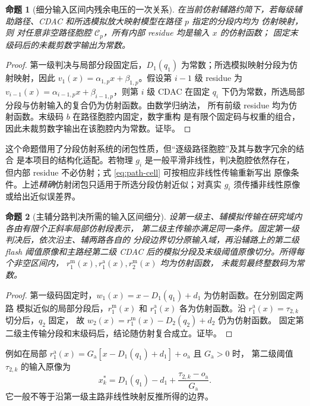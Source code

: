 \documentclass[11pt,a4paper]{ctexart}
\theoremstyle{adcplain}
\newtheorem{proposition}{命题}[section]
\theoremstyle{definition}
\begin{document}
\begin{proposition}[细分输入区间内残余电压的一次关系]
在当前仿射辅路约简下，若每级辅助路径、CDAC 和所选模拟放大映射模型在路径
$p$ 指定的分段内均为
仿射映射，则
对任意非空路径胞腔 $\mathcal C_p$，所有内部 residue 均是输入 $x$ 的仿射函数；
固定末级码后的未裁剪数字输出为常数。
\end{proposition}

\begin{proof}
第一级判决与局部分段固定后，$D_1(q_1)$ 为常数；所选模拟映射分段为仿射映射，因此
$v_1(x)=\alpha_{1,p}x+\beta_{1,p}$。假设第 $i-1$ 级 residue 为
$v_{i-1}(x)=\alpha_{i-1,p}x+\beta_{i-1,p}$，则第 $i$ 级 CDAC 在固定
$q_i$ 下仍为常数，所选局部分段与仿射输入的复合仍为仿射函数。由数学归纳法，
所有前级 residue 均为仿射函数。末级码 $b$ 在路径胞腔内固定，数字重构
是有限个固定码与权重的组合，因此未裁剪数字输出在该胞腔内为常数。证毕。
\end{proof}

这个命题借用了分段仿射系统的闭包性质，但“逐级路径胞腔”及其与数字冗余的结合
是本项目的结构化适配。若物理 $g_i$ 是一般平滑非线性，判决胞腔依然存在，
但内部 residue 不必仿射；式 \eqref{eq:path-cell} 可按相应非线性传输重新写出
原像条件。上述\emph{精确}仿射闭包只适用于所选分段仿射近似；对真实 $g_i$
须传播非线性原像或给出近似误差界。

\begin{proposition}[主辅分路判决所需的输入区间细分]
设第一级主、辅模拟传输在研究域内各由有限个正斜率局部仿射段表示，
第二级主传输亦满足同一条件。固定第一级判决后，依次沿主、辅两路各自的
分段边界切分原输入域，再沿辅路上的第二级 flash 阈值原像和主路经第二级
CDAC 后的模拟分段及末级阈值原像切分。所得每个非空区间内，
$r_1^{\mathrm m}(x),r_1^{\mathrm a}(x),r_2^{\mathrm m}(x)$ 均为仿射函数，
未裁剪最终整数码为常数。
\end{proposition}

\begin{proof}
第一级码固定时，$w_1(x)=x-D_1(q_1)+d_1$ 为仿射函数。在分别固定两路
模拟近似的局部分段后，$r_1^{\mathrm m}(x)$ 和 $r_1^{\mathrm a}(x)$
各为仿射函数。沿 $r_1^{\mathrm a}(x)=\tau_{2,k}$ 切分后，$q_2$ 固定，
故 $w_2(x)=r_1^{\mathrm m}(x)-D_2(q_2)+d_2$ 仍为仿射函数。
固定第二级主传输分段和末级码后，结论随仿射复合成立。证毕。
\end{proof}

例如在局部 $r_1^{\mathrm a}(x)=G_{\mathrm a}
[x-D_1(q_1)+d_1]+o_{\mathrm a}$ 且 $G_{\mathrm a}>0$ 时，
第二级阈值 $\tau_{2,k}$ 的输入原像为
\begin{equation}
  x_k^*=D_1(q_1)-d_1+
    \frac{\tau_{2,k}-o_{\mathrm a}}{G_{\mathrm a}}.
  \label{eq:independent-aux-boundary}
\end{equation}
它一般不等于沿第一级主路非线性映射反推所得的边界。
\end{document}
